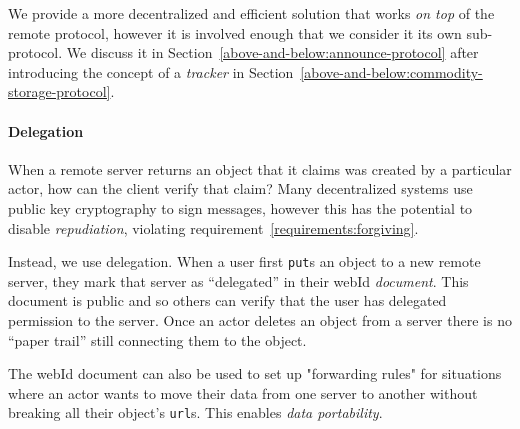 We provide a more decentralized and efficient
solution that works \emph{on top} of the remote protocol,
however it is involved enough that we consider it its own sub-protocol.
We discuss it in Section~\ref{above-and-below:announce-protocol} after introducing the concept
of a \emph{tracker}
in Section~\ref{above-and-below:commodity-storage-protocol}.


\paragraph{Delegation}
\label{above-and-below:delegation}

When a remote server returns an object that it claims
was created by a particular actor, how can the client verify that claim?
Many decentralized systems use public key cryptography to sign messages,
however this has the potential to disable \emph{repudiation},
violating requirement~\ref{requirements:forgiving}.

Instead, we use delegation. When a user first \texttt{put}s an object
to a new remote server, they mark that server as ``delegated'' in their
webId \emph{document}. This document is public and so others can verify
that the user has delegated permission to the server.
Once an actor deletes an object from a server there is no
``paper trail'' still connecting them to the object.

The webId document can also be used to set up "forwarding rules" for
situations where an actor wants to move their data from one server to
another without breaking all their object's \texttt{url}s.
This enables \emph{data portability}.

